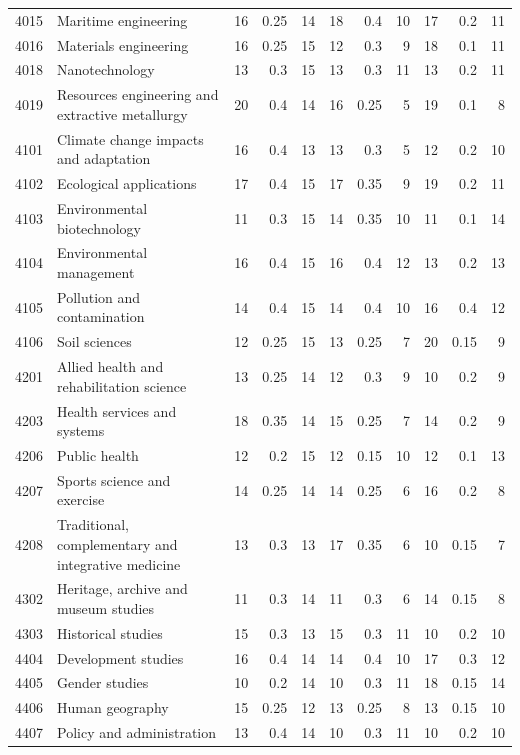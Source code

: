 \begin{longtable}{r p{2.15cm} rrr rrr rrr}
4015 & Maritime engineering & 16 & 0.25 & 14 & 18 & 0.4 & 10 & 17 & 0.2 & 11 \\
4016 & Materials engineering & 16 & 0.25 & 15 & 12 & 0.3 & 9 & 18 & 0.1 & 11 \\
4018 & Nanotechnology & 13 & 0.3 & 15 & 13 & 0.3 & 11 & 13 & 0.2 & 11 \\
4019 & Resources engineering and extractive metallurgy & 20 & 0.4 & 14 & 16 & 0.25 & 5 & 19 & 0.1 & 8 \\
4101 & Climate change impacts and adaptation & 16 & 0.4 & 13 & 13 & 0.3 & 5 & 12 & 0.2 & 10 \\
4102 & Ecological applications & 17 & 0.4 & 15 & 17 & 0.35 & 9 & 19 & 0.2 & 11 \\
4103 & Environmental biotechnology & 11 & 0.3 & 15 & 14 & 0.35 & 10 & 11 & 0.1 & 14 \\
4104 & Environmental management & 16 & 0.4 & 15 & 16 & 0.4 & 12 & 13 & 0.2 & 13 \\
4105 & Pollution and contamination & 14 & 0.4 & 15 & 14 & 0.4 & 10 & 16 & 0.4 & 12 \\
4106 & Soil sciences & 12 & 0.25 & 15 & 13 & 0.25 & 7 & 20 & 0.15 & 9 \\
4201 & Allied health and rehabilitation science & 13 & 0.25 & 14 & 12 & 0.3 & 9 & 10 & 0.2 & 9 \\
4203 & Health services and systems & 18 & 0.35 & 14 & 15 & 0.25 & 7 & 14 & 0.2 & 9 \\
4206 & Public health & 12 & 0.2 & 15 & 12 & 0.15 & 10 & 12 & 0.1 & 13 \\
4207 & Sports science and exercise & 14 & 0.25 & 14 & 14 & 0.25 & 6 & 16 & 0.2 & 8 \\
4208 & Traditional, complementary and integrative medicine & 13 & 0.3 & 13 & 17 & 0.35 & 6 & 10 & 0.15 & 7 \\
4302 & Heritage, archive and museum studies & 11 & 0.3 & 14 & 11 & 0.3 & 6 & 14 & 0.15 & 8 \\
4303 & Historical studies & 15 & 0.3 & 13 & 15 & 0.3 & 11 & 10 & 0.2 & 10 \\
4404 & Development studies & 16 & 0.4 & 14 & 14 & 0.4 & 10 & 17 & 0.3 & 12 \\
4405 & Gender studies & 10 & 0.2 & 14 & 10 & 0.3 & 11 & 18 & 0.15 & 14 \\
4406 & Human geography & 15 & 0.25 & 12 & 13 & 0.25 & 8 & 13 & 0.15 & 10 \\
4407 & Policy and administration & 13 & 0.4 & 14 & 10 & 0.3 & 11 & 10 & 0.2 & 10 \\

\end{longtable}
